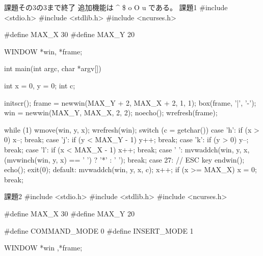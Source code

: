 \documentclass[a4paper,11pt]{jsarticle}
\begin{document}
課題その3の3まで終了
追加機能は
^
\$
o
O
u
である。
課題1
#include <stdio.h>
#include <stdlib.h>
#include <ncurses.h>

#define MAX_X 30
#define MAX_Y 20

WINDOW *win, *frame;

int main(int argc, char *argv[])
{
    int x = 0, y = 0;
    int c;

    initscr();
    frame = newwin(MAX_Y + 2, MAX_X + 2, 1, 1);
    box(frame, '|', '-');
    win = newwin(MAX_Y, MAX_X, 2, 2);
    noecho();
    wrefresh(frame);

    while (1)
    {
        wmove(win, y, x);
        wrefresh(win);
        switch (c = getchar())
        {
        case 'h':
            if (x > 0)
                x--;
            break;
        case 'j':
            if (y < MAX_Y - 1)
                y++;
            break;
        case 'k':
            if (y > 0)
                y--;
            break;
        case 'l':
            if (x < MAX_X - 1)
                x++;
            break;
        case ' ':
            mvwaddch(win, y, x, (mvwinch(win, y, x) == ' ') ? '*' : ' ');
            break;
        case 27: // ESC key
            endwin();
            echo();
            exit(0);
        default:
            mvwaddch(win, y, x, c);
            x++;
            if (x >= MAX_X)
            {
                x = 0;
            }
            break;
        }
    }
}
課題2
#include <stdio.h>
#include <stdlib.h>
#include <ncurses.h>

#define MAX_X 30
#define MAX_Y 20

#define COMMAND_MODE 0
#define INSERT_MODE 1

WINDOW *win ,*frame;
\end{document}

